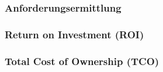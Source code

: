 \cite{changes_in_requirements_engineering}


\subsubsection{Anforderungsermittlung}
\subsubsection{Return on Investment (ROI)}
\subsubsection{Total Cost of Ownership (TCO)}

